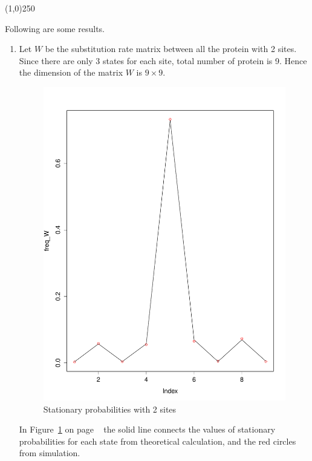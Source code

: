 \documentclass[13pt]{article}
\begin{document}
\begin{center}
\line(1,0){250}
\end{center}

Following are some results.\\
\begin{enumerate}
\item Let $W$ be the substitution rate matrix between all the protein with 2 sites. Since there are only 3 states for each site, total number of protein is 9. Hence the dimension of the matrix $W$ is $9\times 9$.\\
\begin{figure}[here]
\centering
\includegraphics[scale=0.2]{freq_simple_sim.pdf}
\caption{Stationary probabilities with 2 sites}
\label{fig:freq2sites}
\end{figure}

In Figure~\ref{fig:freq2sites} on page ~\pageref{fig:freq2sites} the solid line connects the values of stationary probabilities for each state from theoretical calculation, and the red circles from simulation. \\


\end{enumerate}
\end{document}
